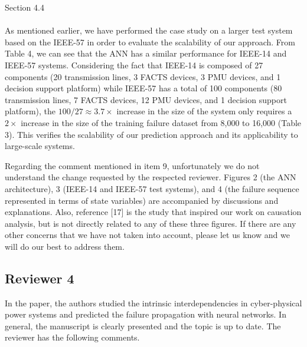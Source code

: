 \documentclass{article}
\newenvironment{response}{
  \doublespacing
  \setlength\parindent{0.05\linewidth}
  \ttfamily
}{}
\newenvironment{textblock}[1]
{\begin{tcolorbox}[breakable,enhanced]{#1 \\ \\}}
{\end{tcolorbox}}
\begin{document}
\begin{response}
\begin{textblock}{Section 4.4}
As mentioned earlier, we have performed the case study on a larger test system based on the IEEE-57 in order to evaluate the scalability of our approach. From Table 4, we can see that the ANN has a similar performance for IEEE-14 and IEEE-57 systems. Considering the fact that IEEE-14 is composed of 27 components (20 transmission lines, 3 FACTS devices, 3 PMU devices, and 1 decision support platform) while IEEE-57 has a total of 100 components (80 transmission lines, 7 FACTS devices, 12 PMU devices, and 1 decision support platform), the $100/27 \approx 3.7 \times$ increase in the size of the system only requires a $2 \times$ increase in the size of the training failure dataset from 8,000 to 16,000 (Table 3). This verifies the scalability of our prediction approach and its applicability to large-scale systems.
\end{textblock}

Regarding the comment mentioned in item 9, unfortunately we do not understand the change requested by the respected reviewer. Figures 2 (the ANN architecture), 3 (IEEE-14 and IEEE-57 test systems), and 4 (the failure sequence represented in terms of state variables) are accompanied by discussions and explanations. Also, reference [17] is the study that inspired our work on causation analysis, but is not directly related to any of these three figures. If there are any other concerns that we have not taken into account, please let us know and we will do our best to address them.

\end{response}

\subsection{Reviewer 4}
\label{sec:reviewer:r4}
In the paper, the authors studied the intrinsic interdependencies in cyber-physical power systems and predicted the failure propagation with neural networks. In general, the manuscript is clearly presented and the topic is up to date. The reviewer has the following comments.
\end{document}
